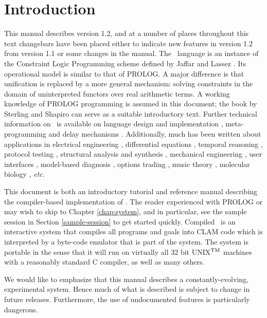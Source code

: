 \chapter{Introduction}
This manual describes \CLPR{} version 1.2, and at a number of places
throughout this text changebars have been placed either to indicate new
features in version 1.2 from version 1.1 or some changes in the manual.
The \CLPR\ language is an instance of the Constraint Logic Programming scheme
defined by Jaffar and Lassez \cite{JAFFAR87A}.
Its operational model is similar to that of
PROLOG. A major difference is that unification is replaced by a more general
mechanism: solving constraints in the domain of uninterpreted functors over
real arithmetic terms. A working knowledge of PROLOG programming is assumed in
this document; the book by Sterling and Shapiro \cite{STERLING86} 
can serve as a suitable introductory text.  Further technical
information on \CLPR\  is available on language design and implementation
\cite{JAFFAR87B,JAFFAR92C}, meta-programming \cite{HEINTZE89} and delay
mechanisms \cite{JAFFAR91}. 
Additionally, much has been written about
applications in electrical engineering \cite{HEINTZE87,MOZETIC91}, 
differential equations \cite{HARLAND87,HOMIAK91}, 
temporal reasoning \cite{AMON92,AMON92B,BRZOSKA91},
protocol testing \cite{GORLICK87},
structural analysis and synthesis \cite{LAKMAZAHERI89},
mechanical engineering \cite{STHANUSUBRAMONIAN91},
user interfaces \cite{YEUNG88},
model-based diagnosis \cite{YU91},
options trading \cite{LASSEZ87A}, 
music theory \cite{TOBIAS88},
molecular biology \cite{YAP91},
{\em etc}.

This document is both an introductory tutorial and  
reference manual describing the compiler-based
implementation of \CLPR. The reader experienced with PROLOG or \CLPR{}
may wish to 
skip to Chapter \ref{chap:system}, and in particular, see the sample
session in Section \ref{sample-session} to get started quickly.
Compiled \CLPR\ is an interactive system that compiles all programs and
goals into CLAM code which is interpreted by a byte-code emulator
that is part of the system. The system is portable in the sense that it will
run on virtually all 32 bit UNIX$^{\mbox{\scriptsize TM}}$ 
machines with a reasonably 
standard C compiler, as well as many others.

We would like to emphasize that this manual describes a constantly-evolving,
experimental system. Hence much of what is described is subject to change in
future releases. Furthermore, the use of undocumented features is 
particularly dangerous.

